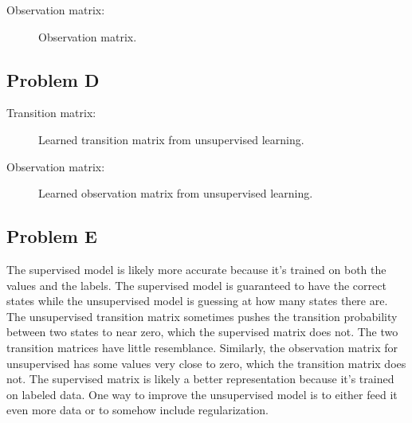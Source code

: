 \documentclass[12pt]{article} %
\begin{document}
Observation matrix:
\begin{figure}[H]
	\vspace{-10mm}
	\caption{Observation matrix.}
\end{figure}

\newpage
\subsection{Problem D}

Transition matrix:
\begin{figure}[H]
	\caption{Learned transition matrix from unsupervised learning.}
\end{figure}

Observation matrix:
\begin{figure}[H]
	\caption{Learned observation matrix from unsupervised learning.}
\end{figure}

\subsection{Problem E}
The supervised model is likely more accurate because it's trained on both the values and the labels. The supervised model is guaranteed to have the correct states while the unsupervised model is guessing at how many states there are. The unsupervised transition matrix sometimes pushes the transition probability between two states to near zero, which the supervised matrix does not. The two transition matrices have little resemblance. Similarly, the observation matrix for unsupervised has some values very close to zero, which the transition matrix does not. The supervised matrix is likely a better representation because it's trained on labeled data. One way to improve the unsupervised model is to either feed it even more data or to somehow include regularization.
\end{document}
